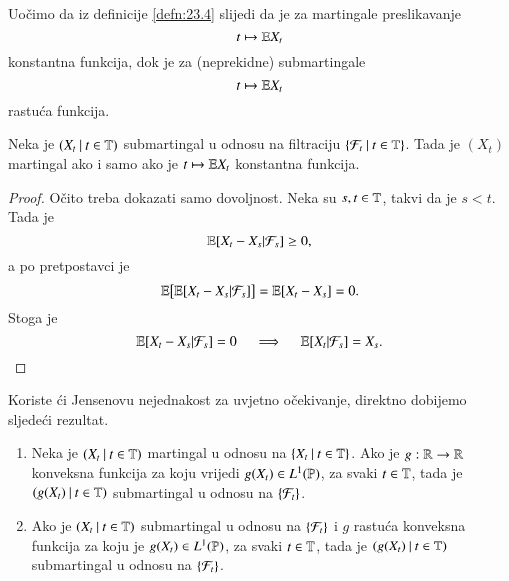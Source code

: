 Uo\v cimo da iz definicije \ref{defn:23.4} slijedi da je za martingale preslikavanje
\begin{equation*}
    t \mapsto \mathbb{E} X_t
\end{equation*}
konstantna funkcija, dok je za (neprekidne) submartingale
\begin{equation*}
    t \mapsto \mathbb{E} X_t
\end{equation*}
rastu\' ca funkcija.

\begin{prop}    \label{prop:23.10}
    Neka je $({X_t} \: | \: {t \in \mathbb{T}})$ submartingal u odnosu na filtraciju $\{{\mathcal{F}_t} \: | \: {t \in \mathbb{T}}\}$.
    Tada je $(X_t)$ martingal ako i samo ako je $t \mapsto \mathbb{E} X_t$ konstantna funkcija.
\end{prop}

\begin{proof}
    O\v cito treba dokazati samo dovoljnost.
    Neka su $s, t \in \mathbb{T}$, takvi da je $s < t$.
    Tada je
    \begin{equation*}
        \mathbb{E} [X_t - X_s | \mathcal{F}_s] \geq 0,
    \end{equation*}
    a po pretpostavci je
    \begin{equation*}
        \mathbb{E} \big[ \mathbb{E} [X_t - X_s | \mathcal{F}_s] \big] = \mathbb{E} [X_t - X_s] = 0.
    \end{equation*}
    Stoga je
    \begin{equation*}
        \mathbb{E} [X_t - X_s | \mathcal{F}_s] = 0 \quad \implies \quad \mathbb{E} [X_t | \mathcal{F}_s] = X_s.
    \end{equation*}
\end{proof}

Koriste \' ci Jensenovu nejednakost za uvjetno o\v cekivanje, direktno dobijemo sljede\' ci rezultat.

\begin{tm}  \label{tm:23.11}
    \begin{enumerate}[label=(\alph*)]
        \item   \label{tm:23.11.1}
        Neka je $({X_t} \: | \: {t \in \mathbb{T}})$ martingal u odnosu na $\{{X_t} \: | \: {t \in \mathbb{T}}\}$.
        Ako je $g : \mathbb{R} \to \mathbb{R}$ konveksna funkcija za koju vrijedi $g (X_t) \in L^1 (\mathbb{P})$, za svaki $t \in \mathbb{T}$, tada je $({g (X_t)} \: | \: {t \in \mathbb{T}})$ submartingal u odnosu na $\{\mathcal{F}_t\}$.
        \item   \label{tm:23.11.2}
        Ako je $({X_t} \: | \: {t \in \mathbb{T}})$ submartingal u odnosu na $\{\mathcal{F}_t\}$ i $g$ rastu\' ca konveksna funkcija za koju je $g (X_t) \in L^1 (\mathbb{P})$, za svaki $t \in \mathbb{T}$, tada je $({g(X_t)} \: | \: {t \in \mathbb{T}})$ submartingal u odnosu na $\{\mathcal{F}_t\}$.
    \end{enumerate}
\end{tm}

